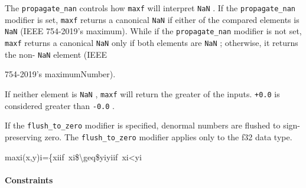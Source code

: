 \documentclass{article}
\begin{document}
The \texttt{propagate\_nan} controls how \texttt{maxf} will interpret \texttt{NaN} . If the \texttt{propagate\_nan} modifier is set, \texttt{maxf} returns a canonical \texttt{NaN} if either of the compared elements is \texttt{NaN} (IEEE 754-2019's maximum). While if the \texttt{propagate\_nan} modifier is not set, \texttt{maxf} returns a canonical \texttt{NaN} only if both elements are \texttt{NaN} ; otherwise, it returns the non- \texttt{NaN} element (IEEE

754-2019's maximumNumber).


If neither element is \texttt{NaN} , \texttt{maxf} will return the greater of the inputs. \texttt{+0.0} is considered greater than \texttt{-0.0} .


If the \texttt{flush\_to\_zero} modifier is specified, denormal numbers are flushed to sign-preserving zero. The \texttt{flush\_to\_zero} modifier applies only to the f32 data type.


maxi(x,y)i=\{xiif xi\$\textbackslash{}geq\$yiyiif xi<yi


\paragraph{Constraints}
\end{document}
